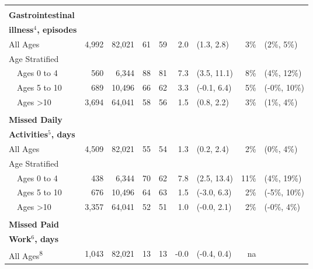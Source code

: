 \documentclass[12pt]{article}\usepackage[]{graphicx}\usepackage[]{color}
\begin{document}
\begin{table}[h!tb]
\begin{footnotesize}
\begin{center}
\begin{tabular}{l rr cc rl rl}
& \\
\textbf{Gastrointestinal} \\
\textbf{illness$^4$, episodes} \\
 All Ages & 4,992 & 82,021 & 61 & 59 & 2.0 & (1.3, 2.8) & 3\% & (2\%, 5\%) \\ 
  
Age Stratified \\
 ~~Ages 0 to 4 & 560 & 6,344 & 88 & 81 & 7.3 & (3.5, 11.1) & 8\% & (4\%, 12\%) \\ 
 ~~Ages 5 to 10 & 689 & 10,496 & 66 & 62 & 3.3 & (-0.1, 6.4) & 5\% & (-0\%, 10\%) \\ 
 ~~Ages >10 & 3,694 & 64,041 & 58 & 56 & 1.5 & (0.8, 2.2) & 3\% & (1\%, 4\%) \\ 
  
& \\
\textbf{Missed Daily} \\
\textbf{Activities$^5$, days} \\
 All Ages & 4,509 & 82,021 & 55 & 54 & 1.3 & (0.2, 2.4) & 2\% & (0\%, 4\%) \\ 
  
Age Stratified \\
 ~~Ages 0 to 4 & 438 & 6,344 & 70 & 62 & 7.8 & (2.5, 13.4) & 11\% & (4\%, 19\%) \\ 
 ~~Ages 5 to 10 & 676 & 10,496 & 64 & 63 & 1.5 & (-3.0, 6.3) & 2\% & (-5\%, 10\%) \\ 
 ~~Ages >10 & 3,357 & 64,041 & 52 & 51 & 1.0 & (-0.0, 2.1) & 2\% & (-0\%, 4\%) \\ 
  
& \\
\textbf{Missed Paid} \\
\textbf{Work$^6$, days} \\
 All Ages\textsuperscript{8} & 1,043 & 82,021 & 13 & 13 & -0.0 & (-0.4, 0.4) & na &  \\ 
  

\end{tabular}
\end{center}
\end{footnotesize}
\end{table}
\end{document}
